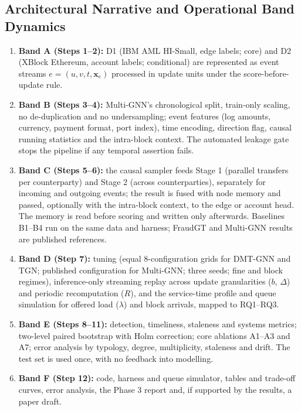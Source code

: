 \documentclass[11pt,a4paper]{article}
\begin{document}
\subsection{Architectural Narrative and Operational Band Dynamics}
\begin{enumerate}[leftmargin=*]
    \item \textbf{Band A (Steps 1--2):} D1 (IBM AML HI-Small, edge labels; core) and D2 (XBlock Ethereum, account labels; conditional) are represented as event streams $e=(u,v,t,\mathbf{x}_e)$ processed in update units under the score-before-update rule.
    \item \textbf{Band B (Steps 3--4):} Multi-GNN's chronological split, train-only scaling, no de-duplication and no undersampling; event features (log amounts, currency, payment format, port index), time encoding, direction flag, causal running statistics and the intra-block context. The automated leakage gate stops the pipeline if any temporal assertion fails.
    \item \textbf{Band C (Steps 5--6):} the causal sampler feeds Stage 1 (parallel transfers per counterparty) and Stage 2 (across counterparties), separately for incoming and outgoing events; the result is fused with node memory and passed, optionally with the intra-block context, to the edge or account head. The memory is read before scoring and written only afterwards. Baselines B1--B4 run on the same data and harness; FraudGT and Multi-GNN results are published references.
    \item \textbf{Band D (Step 7):} tuning (equal 8-configuration grids for DMT-GNN and TGN; published configuration for Multi-GNN; three seeds; fine and block regimes), inference-only streaming replay across update granularities ($b$, $\Delta$) and periodic recomputation ($R$), and the service-time profile and queue simulation for offered load ($\lambda$) and block arrivals, mapped to RQ1--RQ3.
    \item \textbf{Band E (Steps 8--11):} detection, timeliness, staleness and systems metrics; two-level paired bootstrap with Holm correction; core ablations A1--A3 and A7; error analysis by typology, degree, multiplicity, staleness and drift. The test set is used once, with no feedback into modelling.
    \item \textbf{Band F (Step 12):} code, harness and queue simulator, tables and trade-off curves, error analysis, the Phase 3 report and, if supported by the results, a paper draft.
\end{enumerate}
\end{document}
